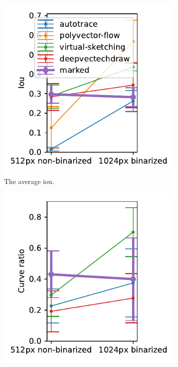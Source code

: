 \begin{figure}[h]
    \centering
    \begin{subfigure}{.3\textwidth}
    \centering
    \includegraphics[width=\textwidth]{graphics/eval/iou_res_binarization_tonari.pdf}
    \caption{The average \gls{iou}.}
\end{subfigure}
    \begin{subfigure}{.3\textwidth}
    \centering
    \includegraphics[width=\textwidth]{graphics/eval/curve ratio_res_binarization_tonari.pdf}

\end{subfigure}
\end{figure}
